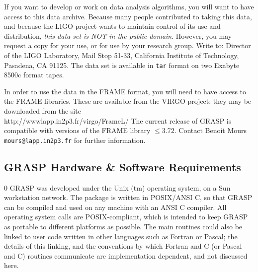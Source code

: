 If you want to develop or work on data analysis algorithms, you will
want to have access to this data archive.  Because many people
contributed to taking this data, and because the LIGO project wants to
maintain control of its use and distribution, {\it this data set is NOT
in the public domain}.  However, you may request a copy for your use,
or for use by your research group.  Write to: Director of the LIGO
Laboratory, Mail Stop 51-33, California Institute of Technology,
Pasadena, CA 91125.  The data set is available in {\tt tar} format on
two Exabyte 8500c format tapes.

In order to use the data in the FRAME format, you will need to have access
to the FRAME libraries.  These are available from the VIRGO project; they
may be downloaded from the site\\
{http://wwwlapp.in2p3.fr/virgo/FrameL/}
The current release of GRASP is compatible with versions of the FRAME library
$\le 3.72$.
Contact Benoit Mours {\tt mours@lapp.in2p3.fr} for further information.

\subsection{GRASP Hardware \& Software Requirements}
\setcounter{equation}0
GRASP was developed under the Unix (tm) operating system, on a Sun
workstation network.  The package is written in POSIX/ANSI C, so that
GRASP can be compiled and used on any machine with an ANSI C compiler.
All operating system calls are POSIX-compliant, which is intended to keep
GRASP as portable to different platforms as possible.  The main routines
could also be linked to user code written in other languages such as
Fortran or Pascal; the details of this linking, and the conventions
by which Fortran and C (or Pascal and C) routines communicate are
implementation dependent, and not discussed here.


